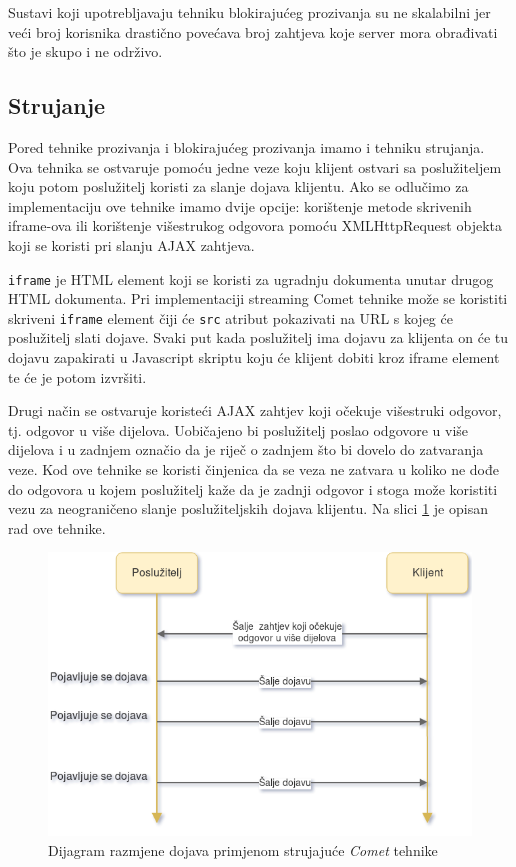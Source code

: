 \documentclass[times, utf8, zavrsni]{fer}
\begin{document}
Sustavi koji upotrebljavaju tehniku blokirajućeg prozivanja su ne skalabilni jer veći broj korisnika drastično povećava broj zahtjeva koje server mora obrađivati što je skupo i ne održivo. 

\subsection{Strujanje}
Pored tehnike prozivanja i blokirajućeg prozivanja imamo i tehniku strujanja. Ova tehnika se ostvaruje pomoću jedne veze koju klijent ostvari sa poslužiteljem koju potom poslužitelj koristi za slanje dojava klijentu. Ako se odlučimo za implementaciju ove tehnike imamo dvije opcije: korištenje metode skrivenih iframe-ova ili korištenje višestrukog odgovora pomoću XMLHttpRequest objekta koji se koristi pri slanju AJAX zahtjeva.

{\tt iframe} je HTML element koji se koristi za ugradnju dokumenta unutar drugog HTML dokumenta. Pri implementaciji streaming Comet tehnike može se koristiti skriveni {\tt iframe} element čiji će {\tt src}  atribut pokazivati na URL s kojeg će poslužitelj slati dojave. Svaki put kada poslužitelj ima dojavu za klijenta on će tu dojavu zapakirati u Javascript skriptu koju će klijent dobiti kroz iframe element te će je potom izvršiti.

Drugi način se ostvaruje koristeći AJAX zahtjev koji očekuje višestruki odgovor, tj. odgovor u više dijelova. Uobičajeno bi poslužitelj poslao odgovore u više dijelova i u zadnjem označio da je riječ o zadnjem što bi dovelo do zatvaranja veze. Kod ove tehnike se koristi činjenica da se veza ne zatvara u koliko ne dođe do odgovora u kojem poslužitelj kaže da je zadnji odgovor i stoga može koristiti vezu za neograničeno slanje poslužiteljskih dojava klijentu. Na slici \ref{fig:streaming-image} je opisan rad ove tehnike. \citep{carbou2011}

\begin{figure}[htb]
\centering
\includegraphics[width=14cm]{img/streaming.png}
\caption{Dijagram razmjene dojava primjenom strujajuće {\em Comet} tehnike}
\label{fig:streaming-image}
\end{figure}
\end{document}
